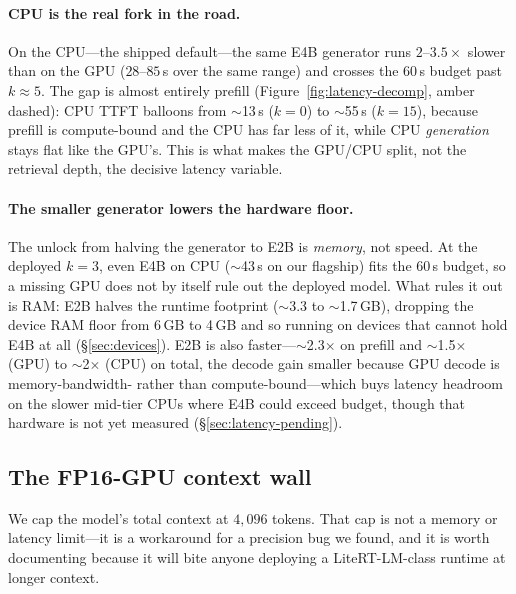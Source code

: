 \paragraph{CPU is the real fork in the road.} On the CPU---the shipped
default---the same E4B generator runs $2$--$3.5\times$ slower than on the GPU
($28$--$85$\,s over the same range) and crosses the 60\,s budget past
$k{\approx}5$. The gap is almost entirely
prefill (Figure~\ref{fig:latency-decomp}, amber dashed): CPU TTFT balloons from
$\sim$13\,s ($k=0$) to $\sim$55\,s ($k=15$), because prefill is compute-bound
and the CPU has far less of it, while CPU \emph{generation} stays flat like the
GPU's. This is what makes the GPU/CPU split, not the retrieval depth, the
decisive latency variable.

\paragraph{The smaller generator lowers the hardware floor.} The unlock
from halving the generator to E2B is \emph{memory}, not speed. At the deployed
$k=3$, even E4B on CPU ($\sim$43\,s on our flagship) fits the 60\,s budget, so a
missing GPU does not by itself rule out the deployed model. What rules it out is
RAM: E2B halves the runtime footprint ($\sim$3.3 to $\sim$1.7\,GB), dropping the
device RAM floor from 6\,GB to 4\,GB and so running on devices that cannot hold
E4B at all (\S\ref{sec:devices}). E2B is also faster---$\sim$2.3$\times$ on
prefill and $\sim$1.5$\times$ (GPU) to $\sim$2$\times$ (CPU) on total, the
decode gain smaller because GPU decode is memory-bandwidth- rather than
compute-bound---which buys latency headroom on the slower mid-tier CPUs where
E4B could exceed budget, though that hardware is not yet measured
(\S\ref{sec:latency-pending}).

\subsection{The FP16-GPU context wall}
\label{sec:context-wall}

We cap the model's total context at $4{,}096$ tokens. That cap is not a memory
or latency limit---it is a workaround for a precision bug we found, and it is
worth documenting because it will bite anyone deploying a LiteRT-LM-class
runtime at longer context.

